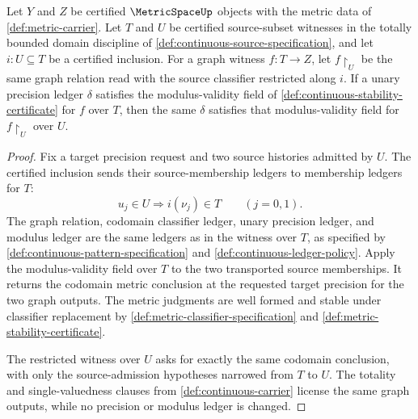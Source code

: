 \begin{proposition}
\label{prop:uniform-modulus-restriction-subset-containment}
Let \(Y\) and \(Z\) be certified \(\MetricSpaceUp\) objects with the metric data of \autoref{def:metric-carrier}. Let \(T\) and \(U\) be certified source-subset witnesses in the totally bounded domain discipline of \autoref{def:continuous-source-specification}, and let \(i:U\subseteq T\) be a certified inclusion. For a graph witness \(f:T\to Z\), let \(f\!\restriction_U\) be the same graph relation read with the source classifier restricted along \(i\). If a unary precision ledger \(\delta\) satisfies the modulus-validity field of \autoref{def:continuous-stability-certificate} for \(f\) over \(T\), then the same \(\delta\) satisfies that modulus-validity field for \(f\!\restriction_U\) over \(U\).
\end{proposition}
\begin{proof}
Fix a target precision request and two source histories admitted by \(U\). The certified inclusion sends their source-membership ledgers to membership ledgers for \(T\):
\[
u_j\in U\Longrightarrow i(\nu_j)\in T\qquad(j=0,1).
\]
The graph relation, codomain classifier ledger, unary precision ledger, and modulus ledger are the same ledgers as in the witness over \(T\), as specified by \autoref{def:continuous-pattern-specification} and \autoref{def:continuous-ledger-policy}. Apply the modulus-validity field over \(T\) to the two transported source memberships. It returns the codomain metric conclusion at the requested target precision for the two graph outputs. The metric judgments are well formed and stable under classifier replacement by \autoref{def:metric-classifier-specification} and \autoref{def:metric-stability-certificate}.

The restricted witness over \(U\) asks for exactly the same codomain conclusion, with only the source-admission hypotheses narrowed from \(T\) to \(U\). The totality and single-valuedness clauses from \autoref{def:continuous-carrier} license the same graph outputs, while no precision or modulus ledger is changed.
\end{proof}
